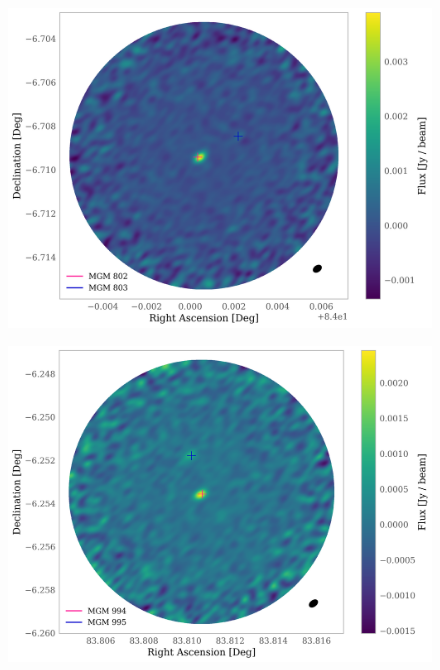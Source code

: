 \documentclass{aa}
\begin{document}
\begin{appendix}
\begin{figure}
\centering
   \includegraphics[width=\columnwidth]{MGM_802.png}
     \caption{}
\end{figure}

\begin{figure}
\centering
   \includegraphics[width=\columnwidth]{MGM_994.png}
     \caption{}
\end{figure}


\end{appendix}
\end{document}
